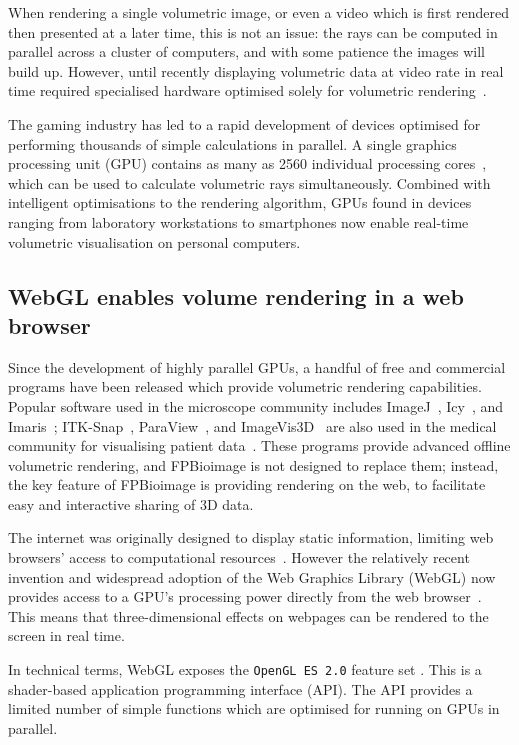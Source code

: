 When rendering a single volumetric image, or even a video which is first rendered then presented at a later time, this is not an issue: the rays can be computed in parallel across a cluster of computers, and with some patience the images will build up.
However, until recently displaying volumetric data at video rate in real time required specialised hardware optimised solely for volumetric rendering~\cite{ray2000resample}.

The gaming industry has led to a rapid development of devices optimised for performing thousands of simple calculations in parallel.
A single graphics processing unit (GPU) contains as many as 2560 individual processing cores~\cite{nvidia1080}, which can be used to calculate volumetric rays simultaneously.
Combined with intelligent optimisations to the rendering algorithm, GPUs found in devices ranging from laboratory workstations to smartphones now enable real-time volumetric visualisation on personal computers.

\subsection{WebGL enables volume rendering in a web browser}
Since the development of highly parallel GPUs, a handful of free and commercial programs have been released which provide volumetric rendering capabilities.
Popular software used in the microscope community includes ImageJ~\cite{schindelin2012fiji}, Icy~\cite{de2012icy}, and Imaris~\cite{imaris}; ITK-Snap~\cite{yushkevich2006user}, ParaView~\cite{ayachit2015paraview}, and ImageVis3D~\cite{imagevis3d2015interactive} are also used in the medical community for visualising patient data~\cite{madan2015creating}.
These programs provide advanced offline volumetric rendering, and FPBioimage is not designed to replace them; instead, the key feature of FPBioimage is providing rendering on the web, to facilitate easy and interactive sharing of 3D data.

The internet was originally designed to display static information, limiting web browsers' access to computational resources~\cite{leiner2009brief}.
However the relatively recent invention and widespread adoption of the Web Graphics Library (WebGL) now provides access to a GPU's processing power directly from the web browser~\cite{khronos2009webgl}.
This means that three-dimensional effects on webpages can be rendered to the screen in real time.

In technical terms, WebGL exposes the \texttt{OpenGL ES 2.0} feature set \cite{khronos2009webgl}.
This is a shader-based application programming interface (API).
The API provides a limited number of simple functions which are optimised for running on GPUs in parallel.

